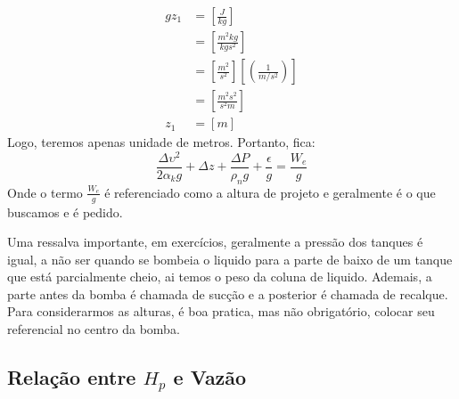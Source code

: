 \begin{align}
    gz_1&=[\frac{J}{kg}]\\
    &=[\frac{m^{2} kg}{kgs^{2}}]\\
    &=[\frac{m^{2} }{s ^{2} }] [(\frac{1}{m/s ^{2}})]\\
    &=[\frac{m^{2} s ^{2} }{s ^{2} m}]\\
    z_1&=[m]
\end{align}
Logo, teremos apenas unidade de metros. Portanto,  fica:
\begin{equation}\label{eq:Eq das bombas}
    \frac{\Delta  \upsilon^{2}}{2\alpha_{k}g}+\Delta  z+\frac{\Delta  P}{\rho_{n}g }+\frac{\epsilon}{g} =\frac{W_e}{g}
\end{equation}
Onde o termo \(\frac{W_e}{g}\) é referenciado como a altura de projeto e geralmente é o que buscamos
e é pedido.\par

Uma ressalva importante, em exercícios, geralmente a pressão dos tanques é igual, a não ser quando
se bombeia o liquido para a parte de baixo de um tanque que está parcialmente cheio, ai temos o peso
da coluna de liquido. Ademais, a parte antes da bomba é chamada de sucção e a posterior é chamada de
recalque. Para considerarmos as alturas, é boa pratica, mas não obrigatório, colocar seu referencial
no centro da bomba.

\subsection{Relação entre \(H_p\) e Vazão}

